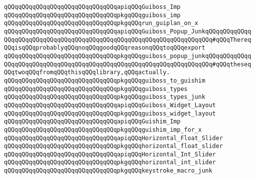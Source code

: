 \newline
\verb|qQQqqQQqqQQqqQQqqQQqqQQqqQQqqQQqapiqQQqGuiboss_Imp|\newline
\verb|qQQqqQQqqQQqqQQqqQQqqQQqqQQqqQQqpkgqQQqguiboss_imp|\newline
\newline
\verb|qQQqqQQqqQQqqQQqqQQqqQQqqQQqqQQqpkgqQQqrun_guiplan_on_x|\newline
\newline
\verb|qQQqqQQqqQQqqQQqqQQqqQQqqQQqqQQqapiqQQqGuiboss_Popup_JunkqQQqqQQqqQQqqQQqqQQqqQQqqQQqqQQqqQQqqQQqqQQqqQQqqQQqqQQqqQQqqQQqqQQqqQQq#qQQqThereqQQqisqQQqprobablyqQQqnoqQQqgoodqQQqreasonqQQqtoqQQqexport|\newline
\verb|qQQqqQQqqQQqqQQqqQQqqQQqqQQqqQQqpkgqQQqguiboss_popup_junkqQQqqQQqqQQqqQQqqQQqqQQqqQQqqQQqqQQqqQQqqQQqqQQqqQQqqQQqqQQqqQQqqQQqqQQq#qQQqtheseqQQqtwoqQQqfromqQQqthisqQQqlibrary,qQQqactually.|\newline
\newline
\verb|qQQqqQQqqQQqqQQqqQQqqQQqqQQqqQQqpkgqQQqguiboss_to_guishim|\newline
\verb|qQQqqQQqqQQqqQQqqQQqqQQqqQQqqQQqpkgqQQqguiboss_types|\newline
\verb|qQQqqQQqqQQqqQQqqQQqqQQqqQQqqQQqpkgqQQqguiboss_types_junk|\newline
\newline
\verb|qQQqqQQqqQQqqQQqqQQqqQQqqQQqqQQqapiqQQqGuiboss_Widget_Layout|\newline
\verb|qQQqqQQqqQQqqQQqqQQqqQQqqQQqqQQqpkgqQQqguiboss_widget_layout|\newline
\newline
\verb|qQQqqQQqqQQqqQQqqQQqqQQqqQQqqQQqapiqQQqGuishim_Imp|\newline
\verb|qQQqqQQqqQQqqQQqqQQqqQQqqQQqqQQqpkgqQQqguishim_imp_for_x|\newline
\newline
\verb|qQQqqQQqqQQqqQQqqQQqqQQqqQQqqQQqapiqQQqHorizontal_Float_Slider|\newline
\verb|qQQqqQQqqQQqqQQqqQQqqQQqqQQqqQQqpkgqQQqhorizontal_float_slider|\newline
\newline
\verb|qQQqqQQqqQQqqQQqqQQqqQQqqQQqqQQqapiqQQqHorizontal_Int_Slider|\newline
\verb|qQQqqQQqqQQqqQQqqQQqqQQqqQQqqQQqpkgqQQqhorizontal_int_slider|\newline
\newline
\verb|qQQqqQQqqQQqqQQqqQQqqQQqqQQqqQQqpkgqQQqkeystroke_macro_junk|\newline
